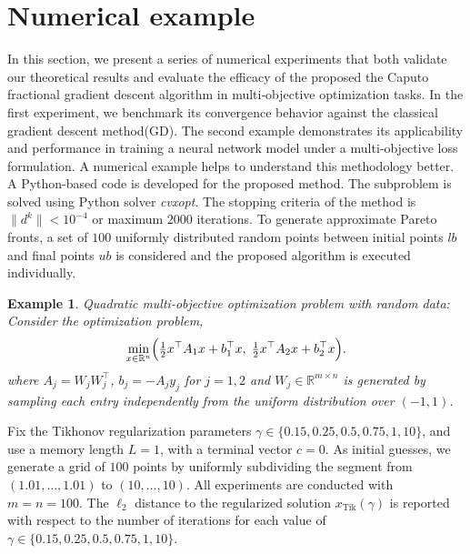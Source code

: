 \documentclass[smallextended,referee,envcountsect]{svjour3}
\newtheorem{e1}{Example}
\begin{document}
\section{Numerical example}\label{sec5}
In this section, we present a series of numerical experiments that both validate our theoretical results and evaluate the efficacy of the proposed the Caputo fractional gradient descent algorithm in multi‐objective optimization tasks. In the first experiment, we benchmark its convergence behavior against the classical gradient descent method(GD). The second example demonstrates its applicability and performance in training a neural network model under a multi‐objective loss formulation.  A numerical example helps to understand this methodology better. A Python-based code is developed for the proposed method. The subproblem is solved using Python solver {\it cvxopt}. The stopping criteria of the method is $\|d^k\|<10^{-4}$ or maximum $2000$ iterations. To generate approximate Pareto fronts, a set of $100$ uniformly distributed random points between initial points $lb$ and final points $ub$ is considered and the proposed algorithm is executed individually. 
\begin{e1}
{\it Quadratic multi-objective optimization problem with random data:} \emph{Consider the optimization problem,
\begin{equation}\label{eq:quadratic_mop}
\min_{x \in \mathbb{R}^n} 
\Bigl(\tfrac{1}{2} x^\top A_1 x + b_1^\top x,\;
      \tfrac{1}{2} x^\top A_2 x + b_2^\top x\Bigr).
\end{equation}
 where $A_j= W_j W_j^\top$, $b_j = -A_jy_j$ for $j=1,2$ and  \( W_j \in \mathbb{R}^{m \times n} \) is generated by sampling each entry independently from the uniform distribution over $(-1,1)$.}
 \end{e1}
Fix the Tikhonov regularization parameters 
\( \gamma \in \{0.15, 0.25, 0.5, 0.75, 1, 10\} \), 
and use a memory length \( L = 1 \), with a terminal vector \( c = 0 \). As initial guesses, we generate a grid of \(100\) points by uniformly subdividing the segment from \((1.01, \dots, 1.01)\) to \((10, \dots, 10)\). All experiments are conducted with \( m = n = 100 \). The $\ell_2$ distance to the regularized solution \( x_{\mathrm{Tik}}(\gamma) \) is reported with respect to the number of iterations for each value of \( \gamma \in \{0.15, 0.25, 0.5, 0.75, 1, 10\} \).
\end{document}
